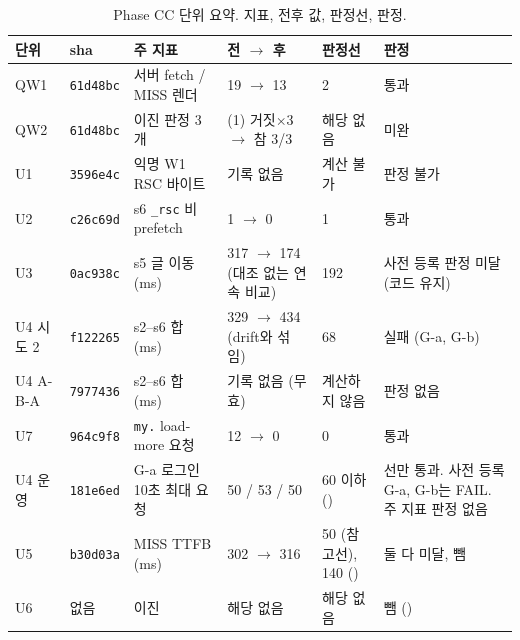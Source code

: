 \begin{table}[H]
  \caption{Phase CC 단위 요약. 지표, 전후 값, 판정선, 판정.}
  \label{tab:le-all}
  \centering\footnotesize
  \begin{tabularx}{\linewidth}{@{}L{1.3cm} L{1.9cm} Y L{2.6cm} L{1.6cm} L{1.7cm}@{}}
    \toprule
    단위 & sha & 주 지표 & 전 $\to$ 후 & 판정선 & 판정 \\
    \midrule
    QW1 & \texttt{61d48bc} & 서버 fetch / MISS 렌더 & 19 $\to$ 13 & 2 & 통과 \\
    \midrule
    QW2 & \texttt{61d48bc} & 이진 판정 3개 & (1) 거짓$\times$3 $\to$ 참 3/3 & 해당 없음 & 미완 \\
    \midrule
    U1 & \texttt{3596e4c} & 익명 W1 RSC 바이트 & 기록 없음 & 계산 불가 & 판정 불가 \\
    \midrule
    U2 & \texttt{c26c69d} & s6 \texttt{\_rsc} 비prefetch & 1 $\to$ 0 & 1 & 통과 \\
    \midrule
    U3 & \texttt{0ac938c} & s5 글 이동 (ms) & 317 $\to$ 174 (대조 없는 연속 비교) & 192 & 사전 등록 판정 미달 (코드 유지) \\
    \midrule
    U4 시도 2 & \texttt{f122265} & s2--s6 합 (ms) & 329 $\to$ 434 (drift와 섞임) & 68 & 실패 (G-a, G-b) \\
    \midrule
    U4 A-B-A & \texttt{7977436} & s2--s6 합 (ms) & 기록 없음 (무효) & 계산하지 않음 & 판정 없음 \\
    \midrule
    U7 & \texttt{964c9f8} & \texttt{my.} load-more 요청 & 12 $\to$ 0 & 0 & 통과 \\
    \midrule
    U4 운영 & \texttt{181e6ed} & G-a 로그인 10초 최대 요청 & 50 / 53 / 50 & 60 이하 () &  선만 통과. 사전 등록 G-a, G-b는 FAIL. 주 지표 판정 없음 \\
    \midrule
    U5 & \texttt{b30d03a} & MISS TTFB (ms) & 302 $\to$ 316 & 50 (참고선), 140 () & 둘 다 미달, 뺌 \\
    \midrule
    U6 & 없음 & 이진 & 해당 없음 & 해당 없음 & 뺌 () \\
    \bottomrule
  \end{tabularx}
\end{table}

